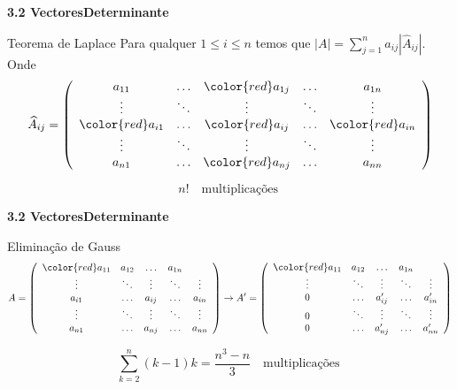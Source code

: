 \documentclass{beamer}
\begin{document}
\begin{frame}{\bf 3.2 Vectores}{\bf Determinante}

\begin{block}{Teorema de Laplace}
Para qualquer $1\leq i \leq n$ temos que $|A| = \sum_{j=1}^n a_{ij} |\widehat{A}_{ij}|.$
Onde  
$$\widehat{A}_{ij} = \left(\begin{array}{ccccc} 
{a_{11}} & \ldots &{\color{red} a_{1j}} & \ldots & {a_{1n}}\\
\vdots  & \ddots & \vdots  & \ddots & \vdots \\
{\color{red} a_{i1}} & \ldots &{\color{red} a_{ij}} & \ldots & {\color{red} a_{in}}\\  
\vdots  & \ddots & \vdots  & \ddots & \vdots \\
{a_{n1}} & \ldots &{\color{red} a_{nj}} & \ldots & { a_{nn}}\\
\end{array}\right)$$
\end{block}

$$ n!\:\:\: \mbox{ multiplicações }$$

\end{frame}


\begin{frame}{\bf 3.2 Vectores}{\bf Determinante}

\begin{block}{Eliminação de Gauss}
$$A = \left(\begin{array}{ccccc} 
{\color{red} a_{11}} & a_{12} & \ldots & {a_{1n}}\\
\vdots  & \ddots & \vdots  & \ddots & \vdots \\
{a_{i1}} & \ldots &{a_{ij}} & \ldots & {a_{in}}\\  
\vdots  & \ddots & \vdots  & \ddots & \vdots \\
{a_{n1}} & \ldots &{a_{nj}} & \ldots & { a_{nn}}\\
\end{array}\right)
\rightarrow 
A' = \left(
\begin{array}{ccccc} 
{\color{red} a_{11}} & a_{12} & \ldots & {a_{1n}}\\
\vdots  & \ddots & \vdots  & \ddots & \vdots \\
0 & \ldots &{a'_{ij}} & \ldots & {a'_{in}}\\  
0  & \ddots & \vdots  & \ddots & \vdots \\
0 & \ldots &{a'_{nj}} & \ldots & { a'_{nn}}\\
\end{array}\right)
$$

$$ \sum_{k=2}^n (k-1)k = \frac{n^3-n}{3}\:\:\: \mbox{ multiplicações }$$
\end{block}

\end{frame}
\end{document}
